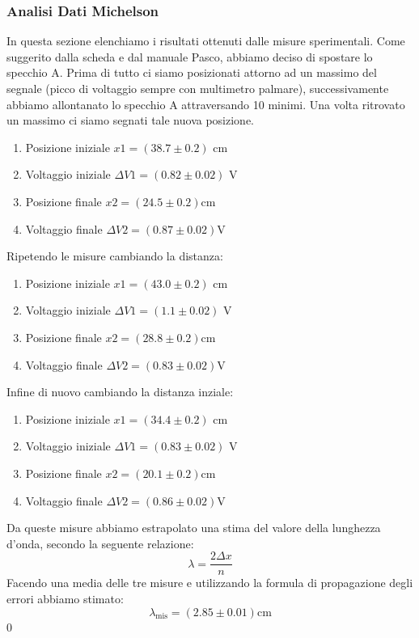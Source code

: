 \documentclass[letterpaper,12pt]{article}
\begin{document}
\subsubsection{Analisi Dati Michelson}
In questa sezione elenchiamo i risultati ottenuti dalle misure sperimentali.
Come suggerito dalla scheda e dal manuale Pasco, abbiamo deciso di spostare lo specchio A. Prima di tutto ci siamo posizionati attorno ad un
massimo del segnale (picco di voltaggio sempre con multimetro palmare), successivamente abbiamo allontanato lo specchio A attraversando 10 minimi. Una volta ritrovato un massimo ci siamo segnati tale nuova posizione.
\begin{enumerate}
	\item Posizione iniziale $x1 =(38.7 \pm0.2)$ cm
	\item Voltaggio iniziale $\Delta V1 = (0.82\pm0.02)$ V 
	\item Posizione finale $x2 =(24.5 \pm0.2)$cm
	\item Voltaggio finale $\Delta V2 = (0.87\pm0.02)$V
\end{enumerate}
Ripetendo le misure cambiando la distanza:
\begin{enumerate}
	\item Posizione iniziale $x1 =(43.0\pm0.2)$ cm
	\item Voltaggio iniziale $\Delta V1 = (1.1\pm0.02)$ V 
	\item Posizione finale $x2 =(28.8\pm0.2)$cm
	\item Voltaggio finale $\Delta V2 = (0.83\pm0.02)$V
\end{enumerate}
Infine di nuovo cambiando la distanza inziale:
\begin{enumerate}
	\item Posizione iniziale $x1 =(34.4\pm0.2)$ cm
	\item Voltaggio iniziale $\Delta V1 = (0.83\pm0.02)$ V 
	\item Posizione finale $x2 =(20.1\pm0.2)$cm
	\item Voltaggio finale $\Delta V2 = (0.86\pm0.02)$V
\end{enumerate}
Da queste misure abbiamo estrapolato una stima del valore della lunghezza d'onda, secondo la seguente relazione:
$$ \lambda = \frac{2\Delta x}{n} $$ 
Facendo una media delle tre misure e utilizzando la formula di propagazione degli errori abbiamo stimato:
$$\lambda_\text{mis} = (2.85 \pm0.01)\text{cm}$$0
\end{document}
